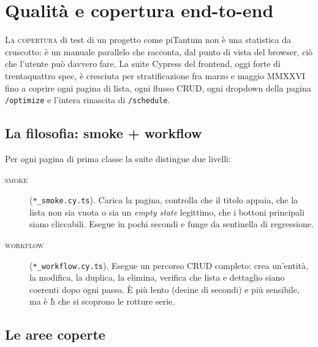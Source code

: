\chapter{Qualit\`a e copertura end-to-end}
\label{ch:qualita-e2e}

\lettrine[lines=3]{L}{a copertura} di test di un progetto come
piTantum non \`e una statistica da cruscotto: \`e un manuale
parallelo che racconta, dal punto di vista del browser, ci\`o che
l'utente pu\`o davvero fare. La suite Cypress del frontend, oggi
forte di trentaquattro spec, \`e cresciuta per stratificazione fra
marzo e maggio MMXXVI fino a coprire ogni pagina di lista, ogni
flusso CRUD, ogni dropdown della pagina \texttt{/optimize} e
l'intera rinascita di \texttt{/schedule}.

\section{La filosofia: smoke + workflow}

Per ogni pagina di prima classe la suite distingue due livelli:

\begin{description}
  \item[\textsc{smoke}] (\texttt{*\_smoke.cy.ts}). Carica la
    pagina, controlla che il titolo appaia, che la lista non sia
    vuota o sia un \emph{empty state} legittimo, che i bottoni
    principali siano cliccabili. Esegue in pochi secondi e
    funge da sentinella di regressione.
  \item[\textsc{workflow}] (\texttt{*\_workflow.cy.ts}). Esegue
    un percorso CRUD completo: crea un'entit\`a, la modifica,
    la duplica, la elimina, verifica che lista e dettaglio siano
    coerenti dopo ogni passo. \`E pi\`u lento (decine di
    secondi) e pi\`u sensibile, ma \`e l\`{\i} che si scoprono
    le rotture serie.
\end{description}

\section{Le aree coperte}

